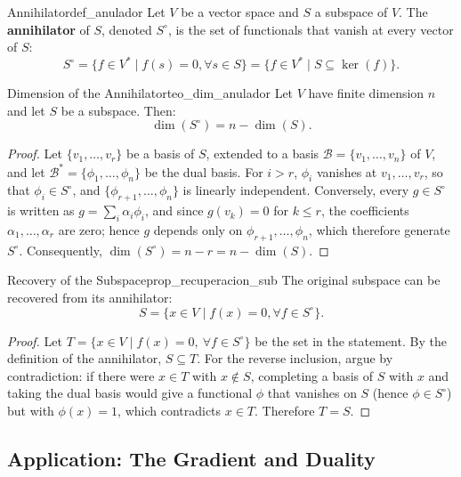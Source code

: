 \documentclass[11pt, a4paper]{article}
\begin{document}
\begin{definicion}{Annihilator}{def_anulador}
Let $V$ be a vector space and $S$ a subspace of $V$. The \textbf{annihilator} of $S$, denoted $S^\circ$, is the set of functionals that vanish at every vector of $S$:
\[
S^\circ = \{ f \in V^* \mid f(s) = 0, \forall s \in S \} = \{ f \in V^* \mid S \subseteq \ker(f) \}.
\]
\end{definicion}

\begin{teorema}{Dimension of the Annihilator}{teo_dim_anulador}
Let $V$ have finite dimension $n$ and let $S$ be a subspace. Then:
\[
\dim(S^\circ) = n - \dim(S).
\]
\end{teorema}

\begin{proof}
Let $\{v_1, \dots, v_r\}$ be a basis of $S$, extended to a basis $\mathcal{B} = \{v_1, \dots, v_n\}$ of $V$, and let $\mathcal{B}^* = \{\phi_1, \dots, \phi_n\}$ be the dual basis. For $i > r$, $\phi_i$ vanishes at $v_1, \dots, v_r$, so that $\phi_i \in S^\circ$, and $\{\phi_{r+1}, \dots, \phi_n\}$ is linearly independent. Conversely, every $g \in S^\circ$ is written as $g = \sum_i \alpha_i \phi_i$, and since $g(v_k) = 0$ for $k \le r$, the coefficients $\alpha_1, \dots, \alpha_r$ are zero; hence $g$ depends only on $\phi_{r+1}, \dots, \phi_n$, which therefore generate $S^\circ$. Consequently, $\dim(S^\circ) = n - r = n - \dim(S)$.
\end{proof}

\begin{proposicion}{Recovery of the Subspace}{prop_recuperacion_sub}
The original subspace can be recovered from its annihilator:
\[
S = \{ x \in V \mid f(x) = 0, \forall f \in S^\circ \}.
\]
\end{proposicion}
\begin{proof}
Let $T = \{ x \in V \mid f(x) = 0, \ \forall f \in S^\circ \}$ be the set in the statement. By the definition of the annihilator, $S \subseteq T$. For the reverse inclusion, argue by contradiction: if there were $x \in T$ with $x \notin S$, completing a basis of $S$ with $x$ and taking the dual basis would give a functional $\phi$ that vanishes on $S$ (hence $\phi \in S^\circ$) but with $\phi(x) = 1$, which contradicts $x \in T$. Therefore $T = S$.
\end{proof}

\subsection{Application: The Gradient and Duality}
\end{document}
